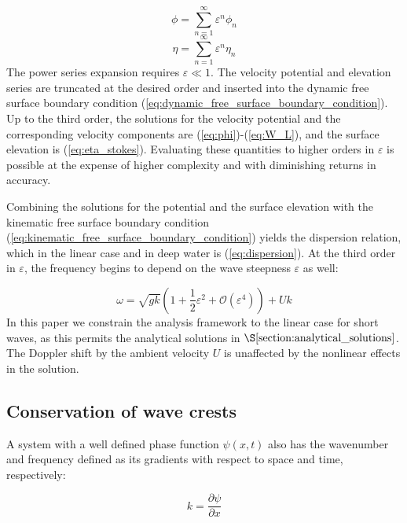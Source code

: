 \documentclass[lineno]{jfm}
\begin{document}
\begin{equation}
  \phi = \sum_{n=1}^{\infty} \varepsilon^n \phi_n
\end{equation}
\begin{equation}
  \eta = \sum_{n=1}^{\infty} \varepsilon^n \eta_n
\end{equation}
The power series expansion requires $\varepsilon \ll 1$.
The velocity potential and elevation series are truncated at the desired order
and inserted into the dynamic free surface boundary condition (\ref{eq:dynamic_free_surface_boundary_condition}).
Up to the third order, the solutions for the velocity potential and the
corresponding velocity components are (\ref{eq:phi})-(\ref{eq:W_L}), and the
surface elevation is (\ref{eq:eta_stokes}).
Evaluating these quantities to higher orders in $\varepsilon$ is possible at
the expense of higher complexity and with diminishing returns in accuracy.

Combining the solutions for the potential and the surface elevation with the
kinematic free surface boundary condition (\ref{eq:kinematic_free_surface_boundary_condition})
yields the dispersion relation, which in the linear case and in deep water is
(\ref{eq:dispersion}).
At the third order in $\varepsilon$, the frequency begins to depend on the wave
steepness $\varepsilon$ as well:

\begin{equation}
  \omega = \sqrt{g k} \left(1 + \frac{1}{2} \varepsilon^2 + \mathcal{O}(\varepsilon^4)\right) + U k
  \label{eq:dispersion_nonlinear}
\end{equation}
In this paper we constrain the analysis framework to the linear case for short
waves, as this permits the analytical solutions in $\S\ref{section:analytical_solutions}$.
The Doppler shift by the ambient velocity $U$ is unaffected by the nonlinear
effects in the solution.

\subsection{Conservation of wave crests}

A system with a well defined phase function $\psi(x,t)$ also has the wavenumber
and frequency defined as its gradients with respect to space and time, respectively:

\begin{equation}
  k = \frac{\partial \psi}{\partial x}
  \label{eq:wavenumber_from_phase}
\end{equation}
\end{document}
